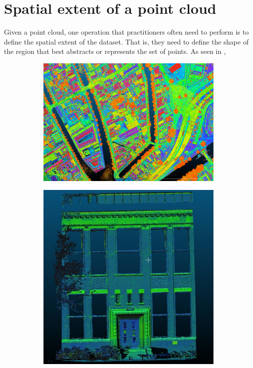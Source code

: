 
\setchapterpreamble[u]{\margintoc}
\graphicspath{{spatialextent/}}

\chapter{Spatial extent of a point cloud}%
\label{chap:spatialextent}


Given a point cloud, one operation that practitioners often need to perform is to define the spatial extent of the dataset.
That is, they need to define the shape of the region that best abstracts or represents the set of points.
As seen in , 
\begin{figure}
  \centering
  \begin{subfigure}[b]{0.49\linewidth}
    \centering
    \includegraphics[width=\textwidth]{figs/ahn3-water.png}
    \caption{}
  \end{subfigure}%
  \qquad
  \begin{subfigure}[b]{0.33\linewidth}
    \centering
    \includegraphics[page=2,width=\textwidth]{figs/facade.jpg}

\end{subfigure}
\end{figure}
